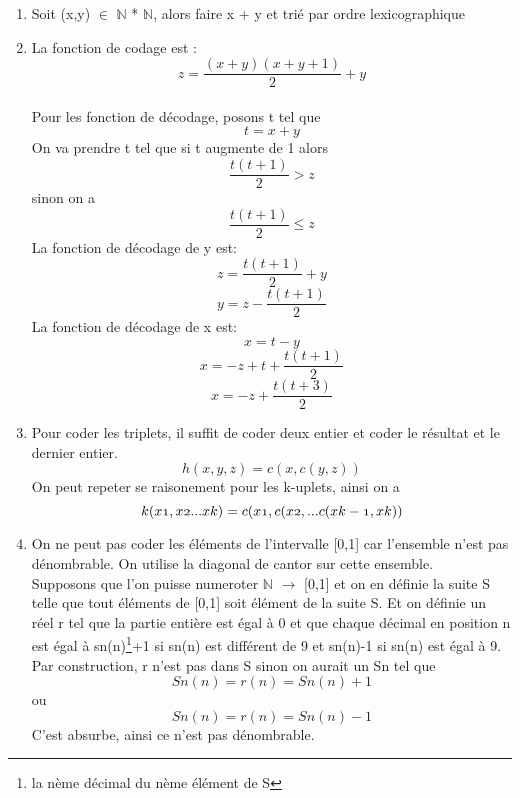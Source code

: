 \documentclass{article}
\begin{document}
\begin{enumerate}
\item Soit (x,y) $\in$ $\mathbb{N}$ * $\mathbb{N}$, alors faire x + y et trié par ordre lexicographique
\item La fonction de codage est : \[z = \frac{(x+y)(x+y+1)}{2} + y\]\\
Pour les fonction de décodage, posons t tel que \[t = x + y\]
On va prendre t tel que si t augmente de 1 alors \[\frac{t(t+1)}{2} > z\] sinon on a \[\frac{t(t+1)}{2} \le z\]
La fonction de décodage de y est: \[z =\frac{t(t+1)}{2} + y\] \[y = z - \frac{t(t+1)}{2}\]
La fonction de décodage de x est: \[x = t - y\] \[x = -z + t + \frac{t(t+1)}{2}\] \[x = -z + \frac{t(t+3)}{2}\]
\item Pour coder les triplets, il suffit de coder deux entier et coder le résultat et le dernier entier. 
  \[h(x,y,z)=c(x , c(y,z))\]
On peut repeter se raisonement pour les k-uplets, ainsi on a 
\[k(x\oldstylenums{1},x\oldstylenums{2}... x\oldstylenums{k}) = c(x\oldstylenums{1} , c(x\oldstylenums{2} , ... c(x\oldstylenums{k-1},x\oldstylenums{k}))\]
\item On ne peut pas coder les éléments de l'intervalle [0,1] car l'ensemble n'est pas dénombrable. On utilise la diagonal de cantor sur cette ensemble.\\
Supposons que l'on puisse numeroter $\mathbb{N}$  $\rightarrow$ [0,1] et on en définie la suite S telle que tout éléments de [0,1] soit élément de la suite S.
Et on définie un réel r tel que la partie entière est égal à 0 et que chaque décimal en position n est égal à sn(n)\footnote{la nème décimal du nème élément de S}+1 si sn(n) est différent de 9 et sn(n)-1 si sn(n) est égal à 9.\\
Par construction, r n'est pas dans S sinon on aurait un Sn tel que \[Sn(n)=r(n)=Sn(n)+1\] ou \[Sn(n)=r(n)=Sn(n)-1\] C'est absurbe, ainsi ce n'est pas dénombrable. 
   
  
\end{enumerate}
\end{document}

